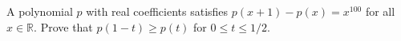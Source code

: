 A polynomial \(p\) with real coefficients satisfies \(p(x+1)-p(x)=x^{100}\) for all \(x \in \mathbb{R}.\) Prove that \(p(1-t) \ge p(t)\) for \(0 \le t \le 1/2.\)